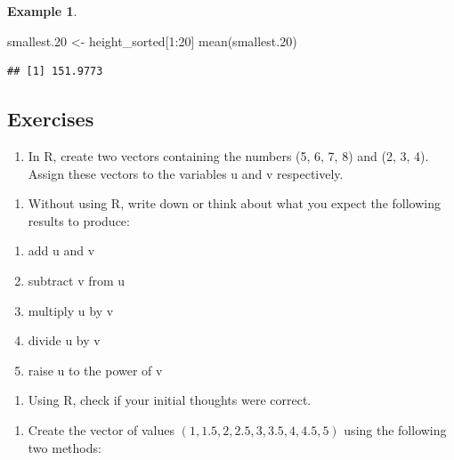 \documentclass[
]{book}
\newenvironment{Shaded}{\begin{snugshade}}{\end{snugshade}}
\newcommand{\DecValTok}[1]{\textcolor[rgb]{0.00,0.00,0.81}{#1}}
\newcommand{\FloatTok}[1]{\textcolor[rgb]{0.00,0.00,0.81}{#1}}
\newcommand{\FunctionTok}[1]{\textcolor[rgb]{0.00,0.00,0.00}{#1}}
\newcommand{\NormalTok}[1]{#1}
\newcommand{\OtherTok}[1]{\textcolor[rgb]{0.56,0.35,0.01}{#1}}
\newcommand{\SpecialCharTok}[1]{\textcolor[rgb]{0.00,0.00,0.00}{#1}}
\providecommand{\tightlist}{%
  \setlength{\itemsep}{0pt}\setlength{\parskip}{0pt}}
\theoremstyle{definition}
\theoremstyle{definition}
\newtheorem{example}{Example}[chapter]
\theoremstyle{definition}
\theoremstyle{definition}
\theoremstyle{remark}
\begin{document}
\begin{example}
\begin{Shaded}
\begin{Highlighting}[]
\NormalTok{smallest}\FloatTok{.20} \OtherTok{\textless{}{-}}\NormalTok{ height\_sorted[}\DecValTok{1}\SpecialCharTok{:}\DecValTok{20}\NormalTok{]}
\FunctionTok{mean}\NormalTok{(smallest}\FloatTok{.20}\NormalTok{)}
\end{Highlighting}
\end{Shaded}

\begin{verbatim}
## [1] 151.9773
\end{verbatim}

\end{example}

\hypertarget{exercises}{%
\subsection{Exercises}\label{exercises}}

\begin{enumerate}
\def\labelenumi{\arabic{enumi}.}
\tightlist
\item
  In R, create two vectors containing the numbers (5, 6, 7, 8) and (2, 3, 4). Assign these vectors to the variables u and v respectively.
\end{enumerate}

\begin{enumerate}
\def\labelenumi{\roman{enumi}.}
\tightlist
\item
  Without using R, write down or think about what you expect the following results to produce:
\end{enumerate}

\begin{enumerate}
\def\labelenumi{\alph{enumi}.}
\tightlist
\item
  add u and v
\item
  subtract v from u
\item
  multiply u by v
\item
  divide u by v
\item
  raise u to the power of v
\end{enumerate}

\begin{enumerate}
\def\labelenumi{\roman{enumi}.}
\setcounter{enumi}{1}
\tightlist
\item
  Using R, check if your initial thoughts were correct.
\end{enumerate}

\begin{enumerate}
\def\labelenumi{\arabic{enumi}.}
\setcounter{enumi}{1}
\tightlist
\item
  Create the vector of values \((1, 1.5, 2, 2.5, 3, 3.5, 4, 4.5, 5)\) using the following two methods:
\end{enumerate}
\end{document}
